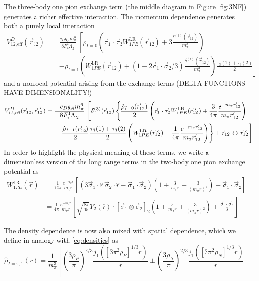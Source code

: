 \documentclass[%
 preprint,
 amsmath,amssymb,
 aps,
]{revtex4-1}
\newcommand{\yukawa}[1]{\frac{e^{-m_\pi |#1|}}{4\pi |#1|}}
\newcommand{\yukawadimless}[1]{\frac{e^{-m_\pi #1}}{m_\pi #1}}
\newcommand{\rot}{\vec{r}_{12}}
\newcommand{\rotp}{\vec{r}_{12}\!\!\!'\;}
\newcommand{\taudot}{\vec{\tau}_1\cdot\vec{\tau}_2}
\newcommand{\sigmadot}{\vec{\sigma}_1\cdot\vec{\sigma}_2}
\newcommand{\sigmatwo}{[\vec{\sigma}_1\otimes\vec{\sigma}_2]_2}
\begin{document}
The three-body one pion exchange term (the middle diagram in Figure \ref{fig:3NF}) generates a richer effective interaction. The momentum dependence generates both a purely local interaction
\begin{equation}\begin{split}
V^{D}_{12,\text{eff}}(\rot)=&\frac{c_D g_Am_\pi^6}{8 F_\pi^4 \Lambda_\chi}\: \left[\rho_{I=0}\left(\taudot W^{\text{LR}}_{1PE}(\rot)  +3\frac{\delta^{(3)}(\rot)}{m_\pi^3}\right) \right. \\
&-\left. \rho_{I=1} \left(W^{\text{LR}}_{1PE}(\rot)+(1-2\sigmadot/3)\frac{\delta^{(3)}(\rot)}{m_\pi^3}\right) \frac{\tau_3(1)+\tau_3(2)}{2} \right]
\end{split}
\end{equation}
and a nonlocal potential arising from the exchange terms (DELTA FUNCTIONS HAVE DIMENSIONALITY!)
\begin{equation}\begin{split}\label{eq:1PENonlocal}
V^{D}_{12,\text{eff}}(\rot,\rotp)=\frac{-c_D g_A m_\pi^6}{8 F_\pi^4 \Lambda_\chi}\: \left[ \delta^{(3)}(\rot)\left\{\frac{\hat{\rho}_{I=0}(r'_{12})}{2}\left(\taudot W^{\text{LR}}_{1PE}(\rotp)+\frac{3}{4\pi}\yukawadimless{r'_{12}}\right) \right.\right.& \\
\left.\left.+\frac{\hat{\rho}_{I=1}(r'_{12})}{2}\frac{\tau_3(1)+\tau_3(2)}{2} \left( W^{\text{LR}}_{1PE}(\rotp)-\frac{1}{4\pi}\yukawadimless{r'_{12}}\right) \right\} + \rot \leftrightarrow \rotp \vphantom{\left(\yukawa{r}^2\right)} \right]\hspace{-.25cm}&
\end{split}\end{equation}
In order to highlight the physical meaning of these terms, we write a dimensionless version of the long range terms in the two-body one pion exchange potential as
\begin{equation}\begin{split}
W^{\text{LR}}_{1PE}(\vec{r})&=\frac{1}{12 \pi}\frac{e^{-m_\pi r}}{m_\pi r}\left[\left(3\vec{\sigma}_1\cdot\hat{r}\:\vec{\sigma}_2\cdot\hat{r}-\sigmadot\right)\left(1+\frac{3}{m_\pi r}+\frac{3}{(m_\pi r)^2}\right)+\sigmadot\right] \\
&=\frac{1}{4 \pi}\frac{e^{-m_\pi r}}{m_\pi r}\left[\sqrt{\frac{8\pi}{15}}Y_2(\hat{r})\cdot\sigmatwo\left(1+\frac{3}{m_\pi r}+\frac{3}{(m_\pi r)^2}\right)+\frac{\sigmadot}{3}\right]
\end{split}
\end{equation}

The density dependence is now also mixed with spatial dependence, which we define in analogy with \eqref{eq:densities} as 
\begin{equation}\label{eq:hatdensities}
\hat{\rho}_{I=0,1}(r)=%
\frac{1}{m_\pi^3}\left[ \left(\frac{3 \rho_P}{\pi}\right)^{2/3} \frac{ j_1( [3\pi^2 \rho_P]^{1/3}  r)}{ r} \pm \left(\frac{3 \rho_N}{\pi}\right)^{2/3} \frac{ j_1( [3\pi^2 \rho_N]^{1/3}  r)}{ r} \right]
\end{equation}
\end{document}
